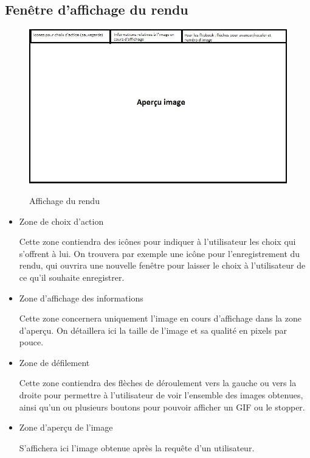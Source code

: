 \subsection{Fenêtre d'affichage du rendu}

\begin{figure}[H]
  \centering
  \includegraphics[scale=0.6]{apercuimage}
  \label{fig:apercu}
  \caption{Affichage du rendu}
\end{figure}

\begin{itemize}
\item Zone de choix d’action
  
  Cette zone contiendra des icônes pour indiquer à l’utilisateur les choix qui s’offrent à lui. On trouvera par exemple une icône pour l’enregistrement du rendu, qui ouvrira une nouvelle fenêtre pour laisser le choix à l’utilisateur de ce qu’il souhaite enregistrer.
  
\item Zone d’affichage des informations
  
  Cette zone concernera uniquement l’image en cours d’affichage dans la zone d’aperçu. On détaillera ici la taille de l’image et sa qualité en pixels par pouce.
  
\item Zone de défilement
  
  Cette zone contiendra des flèches de déroulement vers la gauche ou vers la droite pour permettre à l’utilisateur de voir l’ensemble des images obtenues, ainsi qu’un ou plusieurs boutons pour pouvoir afficher un GIF ou le stopper.
  
\item Zone d’aperçu de l’image
  
  S’affichera ici l’image obtenue après la requête d’un utilisateur.
  
\end{itemize}


